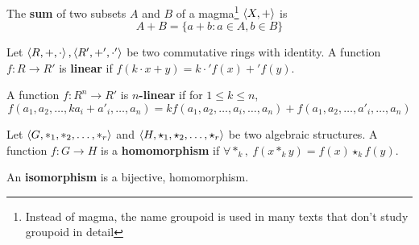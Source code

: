 \begin{definition}
	The \textbf{sum} of two subsets $A$ and $B$ of a magma\footnote{Instead of magma, the name groupoid is used in many texts that don't study groupoid in detail} $\left\langle X,+ \right\rangle$ is 
	$$A+B = \{ a+b : a \in A, b \in B \}$$
\end{definition}

\begin{definition}
	Let $\left\langle R,+,\cdot \right\rangle,\left\langle R',+',\cdot' \right\rangle$ be two commutative rings with identity.
	A function $f : R \to R'$ is \textbf{linear} if $f(k \cdot x+y) = k \cdot' f(x) +' f(y)$.
\end{definition}

\begin{definition}
	A function $f : R^n \to R'$ is \textbf{$n$-linear} if for $1 \le k \le n$,
	\begin{equation*}
		f(a_1,a_2,\dots,ka_i+a'_i,\dots,a_n) = kf(a_1,a_2,\dots,a_i,\dots,a_n) + f(a_1,a_2,\dots,a'_i,\dots,a_n)
	\end{equation*}
\end{definition}

\begin{definition}
	Let $\left\langle G,\ast_1,\ast_2,\dots,\ast_r \right\rangle$ and $\left\langle H,\star_1,\star_2,\dots,\star_r \right\rangle$ be two algebraic structures.
	A function $f : G \to H$ is a \textbf{homomorphism} if $\forall \ast_k,\ f(x \ast_k y) = f(x) \star_k f(y)$.
\end{definition}

\begin{definition}
	An \textbf{isomorphism} is a bijective, homomorphism.
\end{definition}

